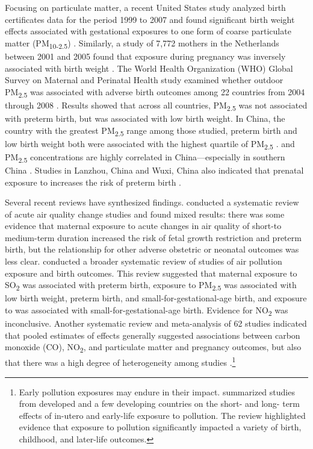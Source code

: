 Focusing on particulate matter, a recent United States study  analyzed birth certificates data for the period 1999 to 2007 and
found significant birth weight effects associated with gestational
exposures to one form of coarse particulate matter (PM\textsubscript{{10-2.5}}) \autocite{ebisu_exposure_2016}. Similarly, a study of
7,772 mothers in the Netherlands between
2001 and 2005 found that \PARPMTEN exposure during pregnancy was inversely
associated with birth weight \autocite{van_den_hooven_air_2012}. The World Health Organization (WHO) Global
Survey on Maternal and Perinatal Health study examined whether outdoor
PM\textsubscript{2.5} was associated with adverse birth outcomes among 22
countries from 2004 through 2008 \autocite{fleischer_outdoor_2014}. Results showed
that across all countries, PM\textsubscript{2.5} was not associated with preterm birth,
but was associated with low birth weight. In China, the country with the greatest PM\textsubscript{2.5} range among those studied,
preterm birth and low birth weight both were associated with the highest
quartile of PM\textsubscript{2.5} \autocite{fleischer_outdoor_2014}. \PARPMTEN and PM\textsubscript{2.5} concentrations
are highly correlated in China---especially in southern China \autocite{zhou_concentrations_2016}. Studies in Lanzhou, China and Wuxi, China also indicated that
prenatal exposure to \PARPMTEN increases the risk of preterm birth \autocite{zhao_ambient_2015, han_maternal_2018}.

Several recent reviews have synthesized
findings. \textcite{melody_maternal_2019} conducted a systematic review of acute
air quality change studies and found mixed results: there was some
evidence that maternal exposure to acute changes in air quality of
short-to medium-term duration increased the risk of fetal growth
restriction and preterm birth, but the relationship for other adverse
obstetric or neonatal outcomes was less clear. \textcite{shah_air_2011} conducted a broader systematic review of studies of air pollution exposure and birth outcomes.  This review suggested that maternal exposure to SO\textsubscript{2} was
associated with preterm birth, exposure to PM\textsubscript{2.5} was associated with low
birth weight, preterm birth, and small-for-gestational-age birth, and
exposure to \PARPMTEN was associated with small-for-gestational-age birth.
Evidence for NO\textsubscript{2} was inconclusive.  Another systematic review and meta-analysis of 62 studies indicated that
pooled estimates of effects generally suggested associations between carbon monoxide (CO),
NO\textsubscript{2}, and particulate matter and pregnancy outcomes, but also that there
was a high degree of heterogeneity among studies \autocite{stieb_ambient_2012}.\footnote{Early pollution exposures may endure in their impact. \textcite{currie_what_2014} summarized studies from developed and a few developing countries on the short- and long- term effects of in-utero and early-life exposure to pollution. The review highlighted evidence that exposure to pollution significantly impacted a variety of birth, childhood, and later-life outcomes.} 
 
